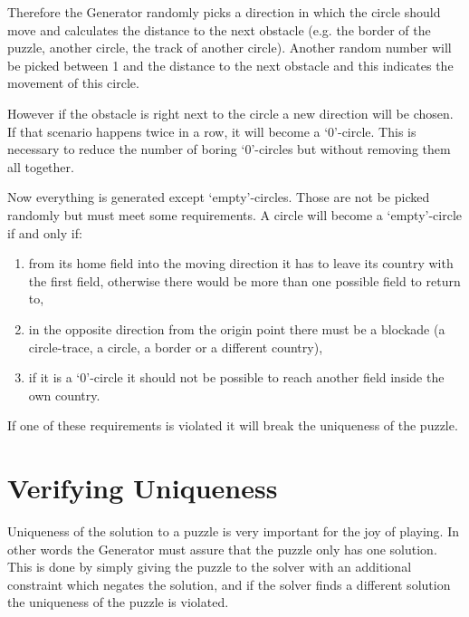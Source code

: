 Therefore the Generator randomly picks a direction in which the circle should move and calculates the distance to the next obstacle (e.g. the border of the puzzle, another circle, the track of another circle). Another random number will be picked between 1 and the distance to the next obstacle and this indicates the movement of this circle. 

However if the obstacle is right next to the circle a new direction will be chosen. If that scenario happens twice in a row, it will become a `0'-circle. This is necessary to reduce the number of boring `0'-circles but without removing them all together.

Now everything is generated except `empty'-circles. Those are not be picked randomly but must meet some requirements. A circle will become a `empty'-circle if and only if:
\begin{enumerate}
  \item from its home field into the moving direction it has to leave its country with the first field, otherwise there would be more than one possible field to return to,
  \item in the opposite direction from the origin point there must be a blockade (a circle-trace, a circle, a border or a different country),
  \item if it is a `0'-circle it should not be possible to reach another field inside the own country.
\end{enumerate}
If one of these requirements is violated it will break the uniqueness of the puzzle.

\section{Verifying Uniqueness}
Uniqueness of the solution to a puzzle is very important for the joy of playing. In other words the Generator must assure that the puzzle only has one solution. This is done by simply giving the puzzle to the solver with an additional constraint which negates the solution, and if the solver finds a different solution the uniqueness of the puzzle is violated.

